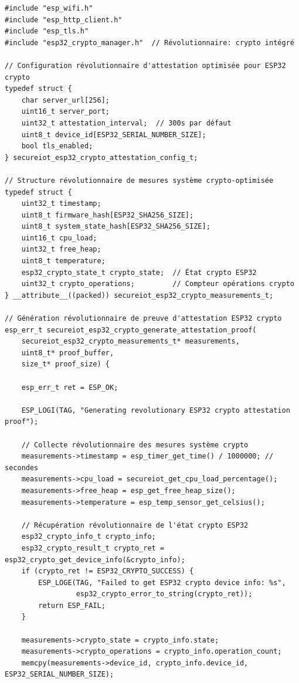 \begin{lstlisting}[caption={Module révolutionnaire d'attestation ESP32 crypto intégré}]
#include "esp_wifi.h"
#include "esp_http_client.h"
#include "esp_tls.h"
#include "esp32_crypto_manager.h"  // Révolutionnaire: crypto intégré

// Configuration révolutionnaire d'attestation optimisée pour ESP32 crypto
typedef struct {
    char server_url[256];
    uint16_t server_port;
    uint32_t attestation_interval;  // 300s par défaut
    uint8_t device_id[ESP32_SERIAL_NUMBER_SIZE];
    bool tls_enabled;
} secureiot_esp32_crypto_attestation_config_t;

// Structure révolutionnaire de mesures système crypto-optimisée
typedef struct {
    uint32_t timestamp;
    uint8_t firmware_hash[ESP32_SHA256_SIZE];
    uint8_t system_state_hash[ESP32_SHA256_SIZE];
    uint16_t cpu_load;
    uint32_t free_heap;
    uint8_t temperature;
    esp32_crypto_state_t crypto_state;  // État crypto ESP32
    uint32_t crypto_operations;         // Compteur opérations crypto
} __attribute__((packed)) secureiot_esp32_crypto_measurements_t;

// Génération révolutionnaire de preuve d'attestation ESP32 crypto
esp_err_t secureiot_esp32_crypto_generate_attestation_proof(
    secureiot_esp32_crypto_measurements_t* measurements,
    uint8_t* proof_buffer,
    size_t* proof_size) {
    
    esp_err_t ret = ESP_OK;
    
    ESP_LOGI(TAG, "Generating revolutionary ESP32 crypto attestation proof");
    
    // Collecte révolutionnaire des mesures système crypto
    measurements->timestamp = esp_timer_get_time() / 1000000; // secondes
    measurements->cpu_load = secureiot_get_cpu_load_percentage();
    measurements->free_heap = esp_get_free_heap_size();
    measurements->temperature = esp_temp_sensor_get_celsius();
    
    // Récupération révolutionnaire de l'état crypto ESP32
    esp32_crypto_info_t crypto_info;
    esp32_crypto_result_t crypto_ret = esp32_crypto_get_device_info(&crypto_info);
    if (crypto_ret != ESP32_CRYPTO_SUCCESS) {
        ESP_LOGE(TAG, "Failed to get ESP32 crypto device info: %s",
                 esp32_crypto_error_to_string(crypto_ret));
        return ESP_FAIL;
    }
    
    measurements->crypto_state = crypto_info.state;
    measurements->crypto_operations = crypto_info.operation_count;
    memcpy(measurements->device_id, crypto_info.device_id, ESP32_SERIAL_NUMBER_SIZE);
    

\end{lstlisting}
